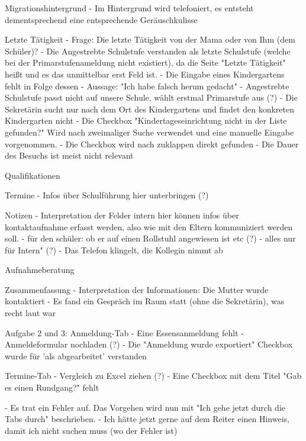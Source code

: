 Migrationshintergrund
- Im Hintergrund wird telefoniert, es entsteht dementsprechend eine entsprechende Geräuschkulisse














Letzte Tätigkeit
- Frage: Die letzte Tätigkeit von der Mama oder von Ihm (dem Schüler)?
- Die Angestrebte Schulstufe verstanden als letzte Schulstufe (welche bei der Primarstufenameldung nicht existiert), da die Seite "Letzte Tätigkeit" heißt und es das unmittelbar erst Feld ist.
 - Die Eingabe eines Kindergartens fehlt in Folge dessen
 - Aussage: "Ich habe falsch herum gedacht"
- Angestrebte Schulstufe passt nicht auf unsere Schule, wählt erstmal Primarstufe aus (?)
- Die Sekretärin sucht nur nach dem Ort des Kindergartens und findet den konkreten Kindergarten nicht
- Die Checkbox "Kindertageseinrichtung nicht in der Liste gefunden?" Wird nach zweimaliger Suche verwendet und eine manuelle Eingabe vorgenommen.
 - Die Checkbox wird nach zuklappen direkt gefunden
- Die Dauer des Besuchs ist meist nicht relevant

Qualifikationen			
 
Termine
- Infos über Schulführung hier unterbringen (?)

Notizen 
- Interpretation der Felder intern hier können infos über kontaktaufnahme erfasst werden, also wie mit den Eltern kommuniziert werden soll.
- für den schüler: ob er auf einen Rollstuhl angewiesen ist etc (?)
- alles nur für Intern"	 (?)
- Das Telefon klingelt, die Kollegin nimmt ab

Aufnahmeberatung							

Zusammenfassung		
- Interpretation der Informationen: Die Mutter wurde kontaktiert
- Es fand ein Gespräch im Raum statt (ohne die Sekretärin), was recht laut war

Aufgabe 2 und 3:
Anmeldung-Tab 
- Eine Essensanmeldung fehlt
- Anmeldeformular nochladen  (?)
- Die "Anmeldung wurde exportiert" Checkbox wurde für 'als abgearbeitet' verstanden

Termine-Tab
- Vergleich zu Excel ziehen (?)
- Eine Checkbox mit dem Titel "Gab es einen Rundgang?" fehlt

- Es trat ein Fehler auf. Das Vorgehen wird nun mit "Ich gehe jetzt durch die Tabs durch" beschrieben.
- Ich hätte jetzt gerne auf dem Reiter einen Hinweis, damit ich nicht suchen muss (wo der Fehler ist)

